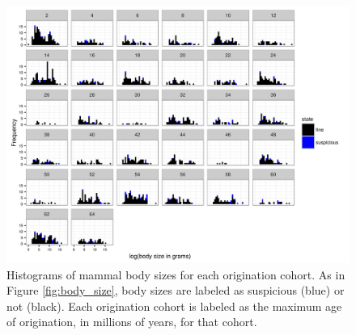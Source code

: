 \documentclass{article}
\begin{document}
\begin{figure}[ht]
  \centering
  \includegraphics[height=0.6\textheight, width=\textwidth, keepaspectratio=true]{figure/body_size_compare_time}
  \caption{Histograms of mammal body sizes for each origination cohort. As in Figure \ref{fig:body_size}, body sizes are labeled as suspicious (blue) or not (black). Each origination cohort is labeled as the maximum age of origination, in millions of years, for that cohort.}
  \label{fig:body_size_time}
\end{figure}
\end{document}
